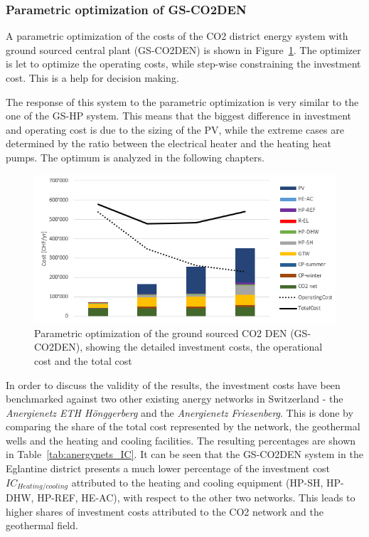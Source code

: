 \documentclass{article}
\begin{document}
\subsubsection{Parametric optimization of GS-CO2DEN}
A parametric optimization of the costs of the CO2 district energy system with ground sourced central plant (GS-CO2DEN) is shown in Figure~\ref{fig:V_CO2_G_PO}. The optimizer is let to optimize the operating costs, while step-wise constraining the investment cost. This is a help for decision making.

The response of this system to the parametric optimization is very similar to the one of the GS-HP system. This means that the biggest difference in investment and operating cost is due to the sizing of the PV, while the extreme cases are determined by the ratio between the electrical heater and the heating heat pumps. The optimum is analyzed in the following chapters.\\

\begin{figure}[htp]
	\centering
	\includegraphics[width=1\textwidth]{V_CO2_G_PO1.png}
	\caption{Parametric optimization of the ground sourced CO2 DEN (GS-CO2DEN), showing the detailed investment costs, the operational cost and the total cost}
	\label{fig:V_CO2_G_PO}
\end{figure}

In order to discuss the validity of the results, the investment costs have been benchmarked against two other existing anergy networks in Switzerland - the \textit{Anergienetz ETH Hönggerberg }and the \textit{Anergienetz Friesenberg}. This is done by comparing the share of the total cost represented by the network, the geothermal wells and the heating and cooling facilities. The resulting percentages are shown in Table~\ref{tab:anergynets_IC}. It can be seen that the GS-CO2DEN system in the Eglantine district presents a much lower percentage of the investment cost  $IC_{Heating/cooling}$ attributed to the heating and cooling equipment (HP-SH, HP-DHW, HP-REF, HE-AC), with respect to the other two networks. This leads to higher shares of investment costs attributed to the CO2 network and the geothermal field.
\end{document}
